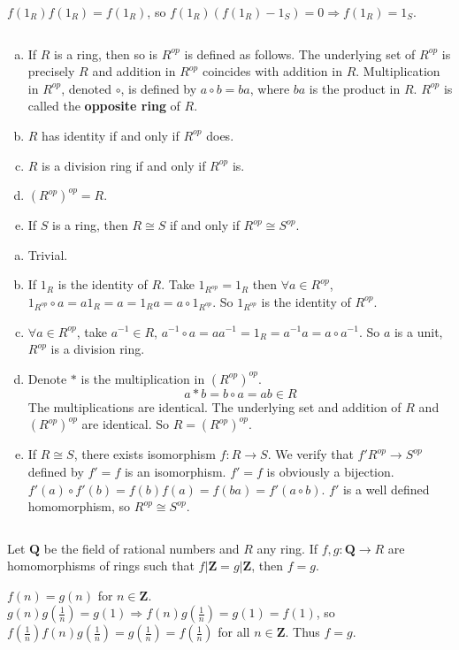 \begin{answer}
    $f(1_{R})f(1_{R})=f(1_{R})$, so $f(1_{R})(f(1_{R})-1_{S})=0\Rightarrow f(1_{R})=1_{S}$.
\end{answer}

$$ $$

\begin{ex}
    \begin{enumerate}[(a)]
        \item If $R$ is a ring, then so is $R^{op}$ is defined as follows. The underlying set of $R^{op}$ is precisely $R$ and addition in $R^{op}$ coincides with addition in $R$. Multiplication in $R^{op}$, denoted $\circ$, is defined by $a\circ b=ba$, where $ba$ is the product in $R$. $R^{op}$ is called the \textbf{opposite ring} of $R$.
        \item $R$ has identity if and only if $R^{op}$ does.
        \item $R$ is a division ring if and only if $R^{op}$ is.
        \item $(R^{op})^{op}=R$.
        \item If $S$ is a ring, then $R\cong S$ if and only if $R^{op}\cong S^{op}$.
    \end{enumerate}
\end{ex}

\begin{answer}
    \begin{enumerate}[(a)]
        \item Trivial.
        \item If $1_{R}$ is the identity of $R$. Take $1_{R^{op}}=1_{R}$ then $\forall a\in R^{op}$, $1_{R^{op}}\circ a=a1_{R}=a=1_{R}a=a\circ 1_{R^{op}}$. So $1_{R^{op}}$ is the identity of $R^{op}$.
        \item $\forall a\in R^{op}$, take $a^{-1}\in R$, $a^{-1}\circ a=aa^{-1}=1_{R}=a^{-1}a=a\circ a^{-1}$. So $a$ is a unit, $R^{op}$ is a division ring.
        \item Denote $*$ is the multiplication in $(R^{op})^{op}$.\[a*b=b\circ a=ab\in R\] The multiplications are identical. The underlying set and addition of $R$ and $(R^{op})^{op}$ are identical. So $R=(R^{op})^{op}$.
        \item If $R\cong S$, there exists isomorphism $f:R\to S$. We verify that $f'R^{op}\to S^{op}$ defined by $f'=f$ is an isomorphism. $f'=f$ is obviously a bijection. $f'(a)\circ f'(b)=f(b)f(a)=f(ba)=f'(a\circ b)$. $f'$ is a well defined homomorphism, so $R^{op}\cong S^{op}$.
    \end{enumerate}
\end{answer}

$$ $$

\begin{ex}
    Let $\mathbf{Q}$ be the field of rational numbers and $R$ any ring. If $f, g:\mathbf{Q}\to R$ are homomorphisms of rings such that $f|\mathbf{Z}=g|\mathbf{Z}$, then $f=g$.
\end{ex}

\begin{answer}
    $f(n)=g(n)$ for $n\in \mathbf{Z}$. $g(n)g(\frac{1}{n})=g(1)\Rightarrow f(n)g(\frac{1}{n})=g(1)=f(1)$, so $f(\frac{1}{n})f(n)g(\frac{1}{n})=g(\frac{1}{n})=f(\frac{1}{n})$ for all $n\in \mathbf{Z}$. Thus $f=g$.
\end{answer}